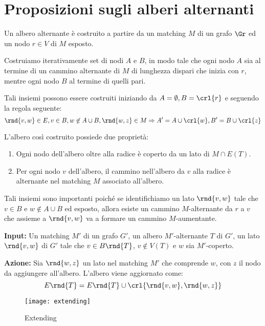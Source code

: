\documentclass[\main/main.tex]{subfiles}
\begin{document}
\section{Proposizioni sugli alberi alternanti}
\begin{definition}
	Un albero alternante è costruito a partire da un matching \(M\) di un grafo \(\Gr \) ed un nodo \(r \in V\) di \(M\) esposto.

	Costruiamo iterativamente set di nodi \(A\) e \(B\), in modo tale che ogni nodo \(A\) sia al termine di un cammino alternante di \(M\) di lunghezza dispari che inizia con \(r\), mentre ogni nodo \(B\) al termine di quelli pari.

	Tali insiemi possono essere costruiti iniziando da \(A=\emptyset, B=\crl{r}\) e seguendo la regola seguente:
	\[
		\rnd{v,w} \in E, v \in B, w \not\in A \cup B, \rnd{w,z} \in M \Rightarrow A' = A \cup \crl{w}, B' = B \cup \crl{z}
	\]

	L'albero così costruito possiede due proprietà:
	\begin{enumerate}
		\item Ogni nodo dell'albero oltre alla radice è coperto da un lato di \(M \cap E(T)\).
		\item Per ogni nodo \(v\) dell'albero, il cammino nell'albero da \(v\) alla radice è alternante nel matching \(M\) associato all'albero.
	\end{enumerate}

	Tali insiemi sono importanti poiché se identifichiamo un lato \(\rnd{v, w}\) tale che \(v \in B\) e \(w \not\in A \cup B\) ed esposto, allora esiste un cammino \(M\)-alternante da \(r\) a \(v\) che assieme a \(\rnd{v, w}\) va a formare un cammino \(M\)-aumentante.
\end{definition}
\begin{definition}
	\textbf{Input:} Un matching \(M'\) di un grafo \(G'\), un albero \(M'\)-alternante \(T\) di \(G'\), un lato \(\rnd{v, w}\) di \(G'\) tale che \(v \in B\rnd{T}\), \(v \not\in V(T)\) e \(w\) sia \(M'\)-coperto.

	\textbf{Azione:} Sia \(\rnd{w, z}\) un lato nel matching \(M'\) che comprende \(w\), con \(z\) il nodo da aggiungere all'albero. L'albero viene aggiornato come:
	\[
		E\rnd{T} = E\rnd{T} \cup \crl{\rnd{v, w}, \rnd{w, z}}
	\]
	\begin{figure}
		\texttt{[image: extending]}
		\caption{Extending}
	\end{figure}
\end{definition}
\end{document}
